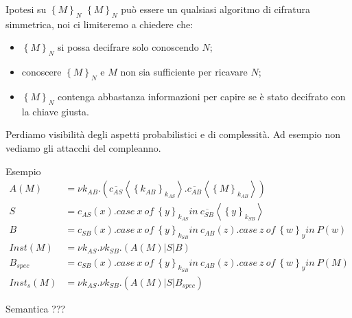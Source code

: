 \documentclass{beamer}
\theoremstyle{plain}
\theoremstyle{definition}
\theoremstyle{remark}
\newcommand{\obar}[1]{\overline{#1}}
\newcommand{\set}[1]{\left\{#1\right\}}
\newcommand{\pa}[1]{\left(#1\right)}
\newcommand{\ang}[1]{\left<#1\right>}
\begin{document}
\begin{frame}{Ipotesi su $\set{M}_N$}
  $\set{M}_N$ pu\`o essere un qualsiasi algoritmo di cifratura simmetrica,
  noi ci limiteremo a chiedere che:
  \begin{itemize}
  \item $\set{M}_N$ si possa decifrare solo conoscendo $N$;
  \item conoscere $\set{M}_N$ e $M$ non sia sufficiente per ricavare $N$;
  \item $\set{M}_N$ contenga abbastanza informazioni per capire se \`e stato
    decifrato con la chiave giusta.
  \end{itemize}
  \vfill

  Perdiamo visibilit\`a degli aspetti probabilistici e di
  complessit\`a. Ad esempio non vediamo gli attacchi del compleanno.
\end{frame}

\begin{frame}{Esempio}
  \begin{align*}
    A(M) & = \nu k_{AB}. \pa{
           \obar{c_{AS}}\ang{\set{k_{AB}}_{k_{AS}}}. \obar{c_{AB}}\ang{\set{M}_{k_{AB}}}}
    \\
    S & = c_{AS}(x).case\ x\ of\ \set{y}_{k_{AS}}in\ 
        \obar{c_{SB}}\ang{\set{y}_{k_{SB}}} \\ 
    B & = c_{SB}(x).case\ x\ of\ \set{y}_{k_{SB}}in\ c_{AB}(z). case\
        z\ of\ \set{w}_y in\ P(w) \\ 
    Inst(M) & = \nu k_{AS}. \nu k_{SB}. \pa{ A(M) | S | B } \\
    B_{spec} & = c_{SB}(x).case\ x\ of\ \set{y}_{k_{SB}}in\ 
               c_{AB}(z). case\ z\ of\ \set{w}_y in\ P(M) \\
    Inst_{s}(M) & = \nu k_{AS}. \nu k_{SB}. \pa{ A(M) | S | B_{spec}}
  \end{align*}
\end{frame}

\begin{frame}{Semantica}
  ???
\end{frame}
\end{document}
